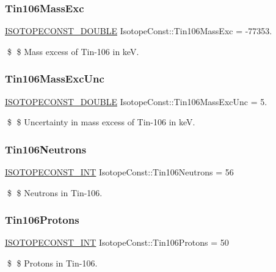 \subsubsection{\texorpdfstring{Tin106\+Mass\+Exc}{Tin106MassExc}}
{\footnotesize\ttfamily \mbox{\hyperlink{group___isotope_const-_macros_ga8f45a7272ce02c0b4c65c44636ed719a}{I\+S\+O\+T\+O\+P\+E\+C\+O\+N\+S\+T\+\_\+\+D\+O\+U\+B\+LE}} Isotope\+Const\+::\+Tin106\+Mass\+Exc = -\/77353.}

\$ \$ Mass excess of Tin-\/106 in keV. \mbox{\label{group___isotope_const-_tin-_sn106_gae7cfbc2d4ca024cef1359571b1a51098}} 
\subsubsection{\texorpdfstring{Tin106\+Mass\+Exc\+Unc}{Tin106MassExcUnc}}
{\footnotesize\ttfamily \mbox{\hyperlink{group___isotope_const-_macros_ga8f45a7272ce02c0b4c65c44636ed719a}{I\+S\+O\+T\+O\+P\+E\+C\+O\+N\+S\+T\+\_\+\+D\+O\+U\+B\+LE}} Isotope\+Const\+::\+Tin106\+Mass\+Exc\+Unc = 5.}

\$ \$ Uncertainty in mass excess of Tin-\/106 in keV. \mbox{\label{group___isotope_const-_tin-_sn106_ga97d8f519a1bf3235ee76bcdc30ed5ff5}} 
\subsubsection{\texorpdfstring{Tin106\+Neutrons}{Tin106Neutrons}}
{\footnotesize\ttfamily \mbox{\hyperlink{group___isotope_const-_macros_ga5f18360b3e99483a35c32d789e62621c}{I\+S\+O\+T\+O\+P\+E\+C\+O\+N\+S\+T\+\_\+\+I\+NT}} Isotope\+Const\+::\+Tin106\+Neutrons = 56}

\$ \$ Neutrons in Tin-\/106. \mbox{\label{group___isotope_const-_tin-_sn106_ga03a401948ad94aa92b0a7a37551ab842}} 
\subsubsection{\texorpdfstring{Tin106\+Protons}{Tin106Protons}}
{\footnotesize\ttfamily \mbox{\hyperlink{group___isotope_const-_macros_ga5f18360b3e99483a35c32d789e62621c}{I\+S\+O\+T\+O\+P\+E\+C\+O\+N\+S\+T\+\_\+\+I\+NT}} Isotope\+Const\+::\+Tin106\+Protons = 50}

\$ \$ Protons in Tin-\/106. 